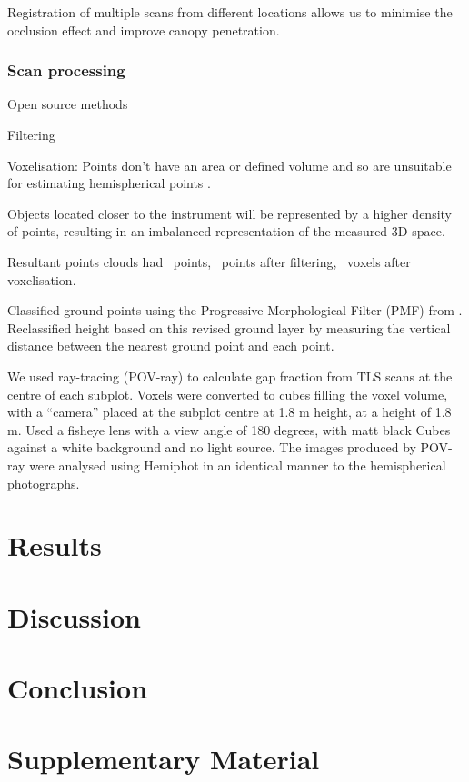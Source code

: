 \documentclass[11pt,a4paper]{article}
\newcommand{\beginsupplement}{%
	\setcounter{table}{0}
	\renewcommand{\thetable}{S\arabic{table}}%
	\setcounter{figure}{0}
	\renewcommand{\thefigure}{S\arabic{figure}}%
	}
\begin{document}
Registration of multiple scans from different locations allows us to minimise the occlusion effect and improve canopy penetration.

\subsubsection{Scan processing}

Open source methods

Filtering

Voxelisation: Points don't have an area or defined volume and so are unsuitable for estimating hemispherical points \citep{Seidel2012}.

Objects located closer to the instrument will be represented by a higher density of points, resulting in an imbalanced representation of the measured 3D space.

Resultant points clouds had ~points, ~points after filtering, ~voxels after voxelisation.

Classified ground points using the Progressive Morphological Filter (PMF) from \citep{Zhang2003}. Reclassified height based on this revised ground layer by measuring the vertical distance between the nearest ground point and each point.

We used ray-tracing (POV-ray) to calculate gap fraction from TLS scans at the centre of each subplot. Voxels were converted to cubes filling the voxel volume, with a ``camera'' placed at the subplot centre at 1.8 m height, at a height of 1.8 m. Used a fisheye lens with a view angle of 180 degrees, with matt black Cubes against a white background and no light source. The images produced by POV-ray were analysed using Hemiphot in an identical manner to the hemispherical photographs.

\section{Results}

\section{Discussion}

\section{Conclusion}

\printbibliography

\section{Supplementary Material}
\beginsupplement
\end{document}
